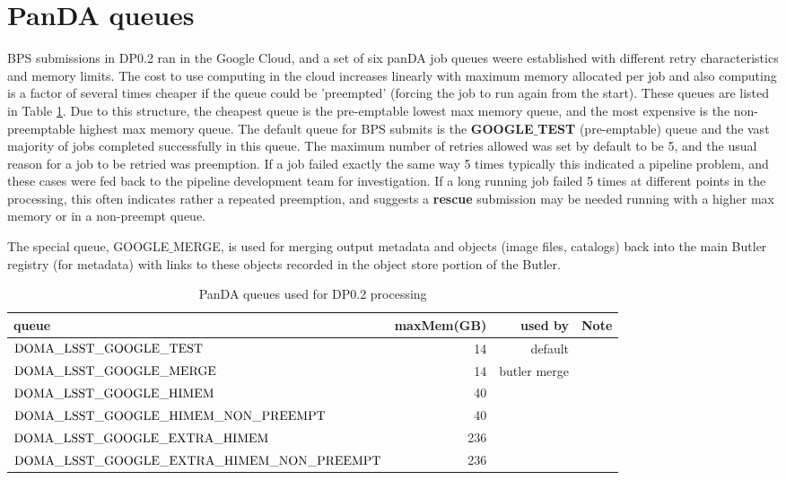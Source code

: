 \documentclass[OPS,authoryear,toc]{lsstdoc}
\begin{document}
\section{PanDA queues}
BPS submissions in DP0.2 ran in the Google Cloud, and a set of six panDA job 
queues weere established with different retry characteristics and 
memory limits.  The cost to use computing in the cloud increases 
linearly with maximum memory allocated per job and also computing is a 
factor of several times cheaper if the queue could 
be 'preempted' (forcing the job to run again from the start).  
These queues are listed in Table \ref{tab:queues}. Due to this 
structure, the cheapest queue is the pre-emptable lowest max 
memory queue, and the most expensive is the 
non-preemptable highest max memory queue. The default queue for BPS submits 
is the {\bf GOOGLE$\_$TEST} (pre-emptable) queue and the vast majority 
of jobs completed successfully in this queue.  The maximum number of
retries allowed was set by default to be 5, and the usual reason for a 
job to be retried was preemption.  If a job failed exactly the same 
way 5 times typically this indicated a pipeline problem, 
and these cases were fed back to the pipeline development team for investigation. 
If a long running job failed 5 times at different points in 
the processing, this often indicates rather a repeated preemption, 
and suggests a {\bf rescue} submission may be needed running with a 
higher max memory or in a non-preempt queue.

The special queue, GOOGLE$\_$MERGE, is used for merging output metadata 
and objects (image files, catalogs) back into the main Butler registry (for
metadata) with links to these objects recorded in the object store portion
of the Butler. 

\begin{center}
\begin{table}[ht]
\caption{PanDA queues used for DP0.2 processing}
\begin{tabular} { |l|r|r|l|}
\hline
queue & maxMem(GB) & used by &  Note\\
\hline
$\rm DOMA\_LSST\_GOOGLE\_TEST$ & 14 & default &\\
$\rm DOMA\_LSST\_GOOGLE\_MERGE$ & 14 & butler merge &\\
$\rm DOMA\_LSST\_GOOGLE\_HIMEM$ & 40 &  &\\
$\rm DOMA\_LSST\_GOOGLE\_HIMEM\_NON\_PREEMPT$ & 40 & &\\
$\rm DOMA\_LSST\_GOOGLE\_EXTRA\_HIMEM$ & 236 &  &\\
$\rm DOMA\_LSST\_GOOGLE\_EXTRA\_HIMEM\_NON\_PREEMPT$ & 236 & &\\
\hline
\end{tabular}
\label{tab:queues}
\end{table}
\end{center}
\end{document}

